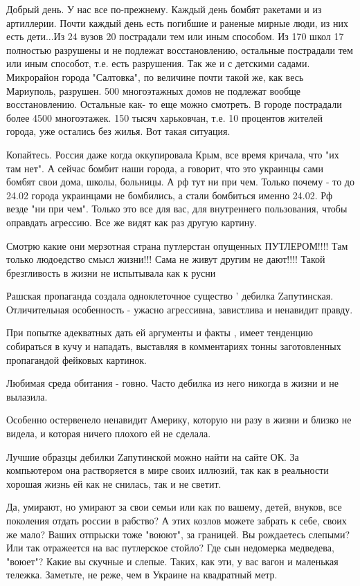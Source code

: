 Добрый день. У нас все по-прежнему. Каждый день бомбят ракетами и из
артиллерии. Почти каждый день есть погибшие и раненые мирные люди, из них есть
дети...Из 24 вузов 20 пострадали тем или иным способом. Из 170 школ 17
полностью разрушены и не подлежат восстановлению, остальные пострадали тем или
иным способот, т.е. есть разрушения. Так же и с детскими садами.  Микрорайон
города "Салтовка", по величине почти такой же, как весь Мариуполь, разрушен.
500 многоэтажных домов не подлежат вообще восстановлению. Остальные как- то еще
можно смотреть. В городе пострадали более 4500 многоэтажек. 150 тысяч
харьковчан, т.е. 10 процентов жителей города,  уже остались без жилья. Вот
такая ситуация.

Копайтесь. Россия даже когда оккупировала Крым, все время кричала, что "их там
нет". А сейчас бомбит наши города, а говорит, что это украинцы сами бомбят свои
дома, школы, больницы. А рф тут ни при чем. Только почему - то до 24.02 города
украинцами не бомбились, а стали бомбиться именно 24.02. Рф везде "ни при чем".
Только это все для вас, для внутреннего пользования, чтобы оправдать агрессию.
Все же видят как раз другую картину.

Смотрю какие они мерзотная страна путлерстан опущенных ПУТЛЕРОМ!!!! Там только
людоедство смысл жизни!!! Сама не живут другим не дают!!!! Такой брезгливость в
жизни не испытывала как к русни

Рашская пропаганда создала одноклеточное существо ' дебилка Zапутинская.
Отличительная особенность - ужасно агрессивна, завистлива и ненавидит правду.

При попытке адекватных дать ей аргументы и факты , имеет тенденцию собираться в
кучу и нападать, выставляя в комментариях тонны заготовленных пропагандой
фейковых картинок.

Любимая среда обитания - говно. Часто дебилка из него никогда в жизни и не
вылазила.

Особенно остервенело ненавидит Америку, которую ни разу в жизни и близко не
видела, и которая ничего плохого ей не сделала.

Лучшие образцы дебилки Zапутинской можно найти на сайте ОК. За компьютером она
растворяется в мире своих иллюзий, так как в реальности хорошая жизнь ей как не
снилась, так и не светит.

Да, умирают, но умирают за свои семьи или как по вашему, детей, внуков, все
поколения отдать россии в рабство? А этих козлов можете забрать к себе, своих
же мало? Ваших отпрыски тоже "воюют", за границей. Вы рождаетесь слепыми? Или
так отражеется на вас путлерское стойло? Где сын недомерка медведева, "воюет"?
Какие вы скучные и слепые. Таких, как эти, у вас вагон и маленькая тележка.
Заметьте, не реже, чем в Украине на квадратный метр.

